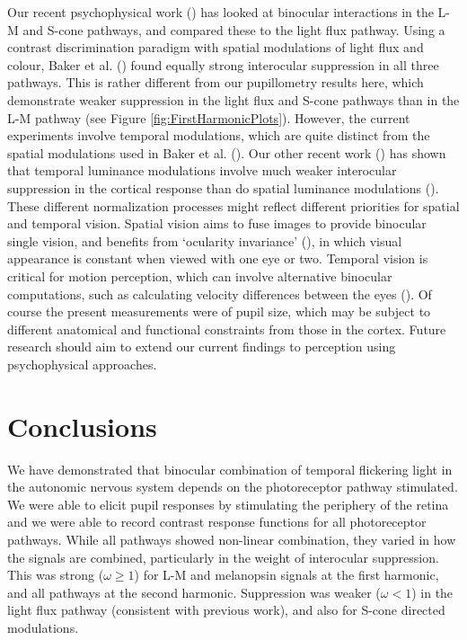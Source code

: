 \documentclass[
]{article}
\begin{document}
Our recent psychophysical work () has looked at binocular interactions in the L-M and S-cone pathways, and compared these to the light flux pathway. Using a contrast discrimination paradigm with spatial modulations of light flux and colour, Baker et al. () found equally strong interocular suppression in all three pathways. This is rather different from our pupillometry results here, which demonstrate weaker suppression in the light flux and S-cone pathways than in the L-M pathway (see Figure \ref{fig:FirstHarmonicPlots}). However, the current experiments involve temporal modulations, which are quite distinct from the spatial modulations used in Baker et al. (). Our other recent work () has shown that temporal luminance modulations involve much weaker interocular suppression in the cortical response than do spatial luminance modulations (). These different normalization processes might reflect different priorities for spatial and temporal vision. Spatial vision aims to fuse images to provide binocular single vision, and benefits from `ocularity invariance' (), in which visual appearance is constant when viewed with one eye or two. Temporal vision is critical for motion perception, which can involve alternative binocular computations, such as calculating velocity differences between the eyes (). Of course the present measurements were of pupil size, which may be subject to different anatomical and functional constraints from those in the cortex. Future research should aim to extend our current findings to perception using psychophysical approaches.

\section{Conclusions}\label{conclusions}

We have demonstrated that binocular combination of temporal flickering light in the autonomic nervous system depends on the photoreceptor pathway stimulated. We were able to elicit pupil responses by stimulating the periphery of the retina and we were able to record contrast response functions for all photoreceptor pathways. While all pathways showed non-linear combination, they varied in how the signals are combined, particularly in the weight of interocular suppression. This was strong (\(\omega \ge 1\)) for L-M and melanopsin signals at the first harmonic, and all pathways at the second harmonic. Suppression was weaker (\(\omega < 1\)) in the light flux pathway (consistent with previous work), and also for S-cone directed modulations.
\end{document}
